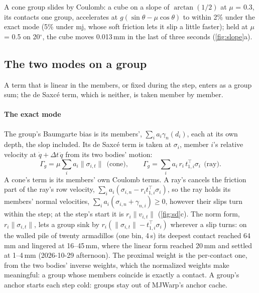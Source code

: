 A cone group slides by Coulomb: a cube on a slope of $\arctan(1/2)$ at $\mu$ = 0.3, its contacts one group, accelerates at $g(\sin\theta - \mu\cos\theta)$ to within 2\% under the exact mode (5\% under mj, whose soft friction lets it slip a little faster); held at $\mu$ = 0.5 on 20$^\circ$, the cube moves 0.013\,mm in the last of three seconds (\cref{fig:slope}a).

\subsection{The two modes on a group}\label{sec:groupexact}

A term that is linear in the members, or fixed during the step, enters as a group sum; the de Saxc\'e term, which is neither, is taken member by member.

\paragraph{The exact mode} The group's Baumgarte bias is its members', $\sum_i a_i \gamma_n(d_i)$, each at its own depth, the slop included. Its de Saxc\'e term is taken at $\sigma_i$, member $i$'s relative velocity at $\dot q + \Delta t\,\ddot q$ from its two bodies' motion:
\begin{equation}\label{eq:desaxce}
\Gamma_g = \mu \sum_i a_i \lVert\sigma_{i,t}\rVert \ \ \text{(cone)}, \qquad \Gamma_g = \sum_i a_i\, r_i\, t_{1,i}^\top\sigma_i \ \ \text{(ray)}.
\end{equation}
A cone's term is its members' own Coulomb terms. A ray's cancels the friction part of the ray's row velocity, $\sum_i a_i(\sigma_{i,n} - r_i t_{1,i}^\top\sigma_i)$, so the ray holds its members' normal velocities, $\sum_i a_i(\sigma_{i,n} + \gamma_{n,i}) \ge 0$, however their slips turn within the step; at the step's start it is $r_i\lVert v_{i,t}\rVert$ (\cref{fig:sd}c). The norm form, $r_i\lVert\sigma_{i,t}\rVert$, lets a group sink by $r_i(\lVert\sigma_{i,t}\rVert - t_{1,i}^\top\sigma_i)$ wherever a slip turns: on the walled pile of twenty armadillos (one bin, 4\,s) its deepest contact reached 64\,mm and lingered at 16--45\,mm, where the linear form reached 20\,mm and settled at 1--4\,mm (2026-10-29 afternoon). The proximal weight is the per-contact one, from the two bodies' inverse weights, which the normalized weights make meaningful: a group whose members coincide is exactly a contact. A group's anchor starts each step cold: groups stay out of MJWarp's anchor cache.

